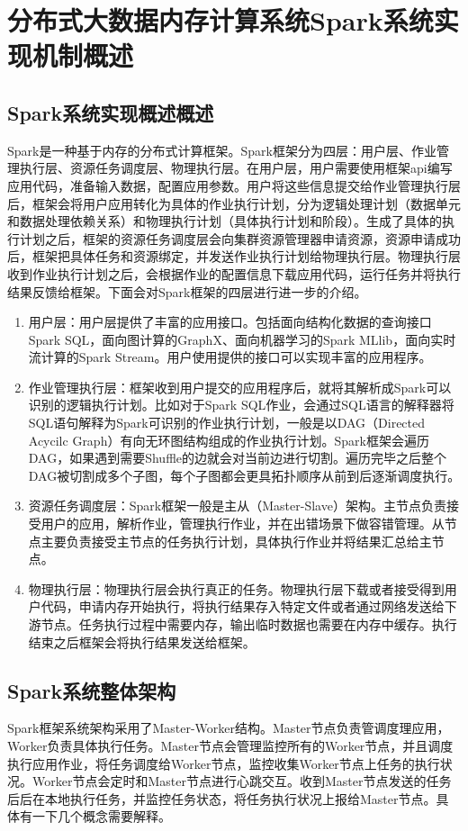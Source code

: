 \chapter{分布式大数据内存计算系统Spark系统实现机制概述}\label{chap:basic}
\section{Spark系统实现概述概述}
Spark是一种基于内存的分布式计算框架。Spark框架分为四层：用户层、作业管理执行层、资源任务调度层、物理执行层。在用户层，用户需要使用框架api编写应用代码，准备输入数据，配置应用参数。用户将这些信息提交给作业管理执行层后，框架会将用户应用转化为具体的作业执行计划，分为逻辑处理计划（数据单元和数据处理依赖关系）和物理执行计划（具体执行计划和阶段）。生成了具体的执行计划之后，框架的资源任务调度层会向集群资源管理器申请资源，资源申请成功后，框架把具体任务和资源绑定，并发送作业执行计划给物理执行层。物理执行层收到作业执行计划之后，会根据作业的配置信息下载应用代码，运行任务并将执行结果反馈给框架。下面会对Spark框架的四层进行进一步的介绍。

\begin{enumerate}
    \item 用户层：用户层提供了丰富的应用接口。包括面向结构化数据的查询接口Spark SQL，面向图计算的GraphX、面向机器学习的Spark MLlib，面向实时流计算的Spark Stream。用户使用提供的接口可以实现丰富的应用程序。
    \item 作业管理执行层：框架收到用户提交的应用程序后，就将其解析成Spark可以识别的逻辑执行计划。比如对于Spark SQL作业，会通过SQL语言的解释器将SQL语句解释为Spark可识别的作业执行计划，一般是以DAG（Directed Acycilc Graph）有向无环图结构组成的作业执行计划。Spark框架会遍历DAG，如果遇到需要Shuffle的边就会对当前边进行切割。遍历完毕之后整个DAG被切割成多个子图，每个子图都会更具拓扑顺序从前到后逐渐调度执行。
    \item 资源任务调度层：Spark框架一般是主从（Master-Slave）架构。主节点负责接受用户的应用，解析作业，管理执行作业，并在出错场景下做容错管理。从节点主要负责接受主节点的任务执行计划，具体执行作业并将结果汇总给主节点。
    \item 物理执行层：物理执行层会执行真正的任务。物理执行层下载或者接受得到用户代码，申请内存开始执行，将执行结果存入特定文件或者通过网络发送给下游节点。任务执行过程中需要内存，输出临时数据也需要在内存中缓存。执行结束之后框架会将执行结果发送给框架。
\end{enumerate}

\section{Spark系统整体架构}
Spark框架系统架构采用了Master-Worker结构。Master节点负责管调度理应用，Worker负责具体执行任务。Master节点会管理监控所有的Worker节点，并且调度执行应用作业，将任务调度给Worker节点，监控收集Worker节点上任务的执行状况。Worker节点会定时和Master节点进行心跳交互。收到Master节点发送的任务后后在本地执行任务，并监控任务状态，将任务执行状况上报给Master节点。具体有一下几个概念需要解释。

